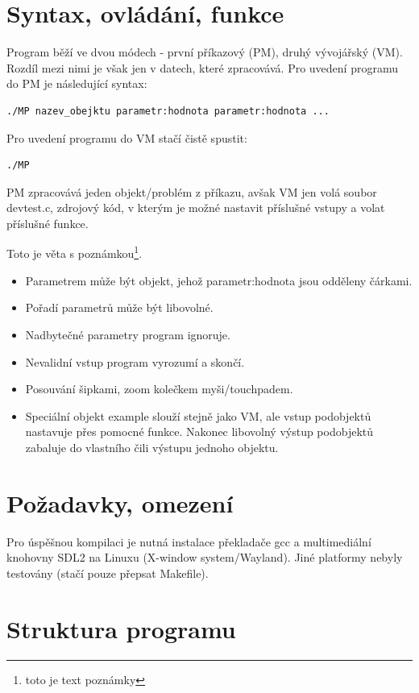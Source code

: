 \documentclass[a4paper,12pt]{book}
\begin{document}
\section{Syntax, ovládání, funkce}

Program běží ve dvou módech - první příkazový (PM), druhý vývojářský (VM).
Rozdíl mezi nimi je však jen v datech, které zpracovává.
Pro uvedení programu do PM je následující syntax:
\begin{lstlisting}
./MP nazev_obejktu parametr:hodnota parametr:hodnota ...
\end{lstlisting}
Pro uvedení programu do VM stačí čistě spustit:
\begin{lstlisting}
./MP
\end{lstlisting}
PM zpracovává jeden objekt/problém z příkazu, avšak VM jen volá soubor devtest.c, zdrojový kód, v kterým je možné nastavit příslušné vstupy a volat příslušné 
funkce.

Toto je věta s poznámkou\footnote{toto je text poznámky}.

\begin{itemize}
  \item Parametrem může být objekt, jehož parametr:hodnota jsou odděleny čárkami.
  \item Pořadí parametrů může být libovolné.
  \item Nadbytečné parametry program ignoruje.
  \item Nevalidní vstup program vyrozumí a skončí.
  \item Posouvání šipkami, zoom kolečkem myši/touchpadem.
  \item Speciální objekt example slouží stejně jako VM, ale vstup podobjektů nastavuje přes pomocné funkce. Nakonec libovolný výstup podobjektů zabaluje do vlastního čili výstupu jednoho objektu.
\end{itemize}

\section{Požadavky, omezení}
 
Pro úspěšnou kompilaci je nutná instalace překladače gcc a multimediální knohovny SDL2 na Linuxu (X-window system/Wayland). Jiné platformy nebyly testovány  (stačí pouze přepsat Makefile).
 
 
\section{Struktura programu}
 
\end{document}

